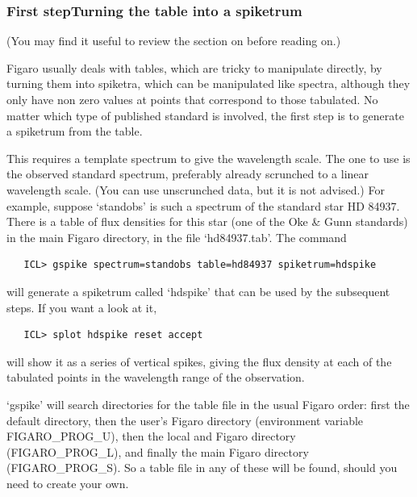 
\subsubsection{\label{techno5first}First step\latorhtm{---}{-}Turning the
   table into a spiketrum}

   (You may find it useful to review
   {the section on }
   before reading on.)

   Figaro usually deals with tables, which are tricky to manipulate
   directly, by turning them into spiketra, which can be manipulated
   like spectra, although they only have non zero values at points that
   correspond to those tabulated.  No matter which type of published
   standard is involved, the first step is to generate a spiketrum from
   the table.

   This requires a template spectrum to give the wavelength scale.  The
   one to use is the observed standard spectrum, preferably already
   scrunched to a linear wavelength scale.  (You can use unscrunched
   data, but it is not advised.)  For example, suppose `standobs' is
   such a spectrum of the standard star HD 84937.  There is a table of
   flux densities for this star (one of the Oke \& Gunn standards) in
   the main Figaro directory, in the file `hd84937.tab'.  The command

\begin{verbatim}
   ICL> gspike spectrum=standobs table=hd84937 spiketrum=hdspike
\end{verbatim}

   will generate a spiketrum called `hdspike' that can be used by the
   subsequent steps.  If you want a look at it,

\begin{verbatim}
   ICL> splot hdspike reset accept
\end{verbatim}

   will show it as a series of vertical spikes, giving the flux density
   at each of the tabulated points in the wavelength range of the
   observation.

   `gspike' will search directories for the table file in the usual
   Figaro order: first the default directory, then the user's Figaro
   directory (environment variable FIGARO\_PROG\_U), then the local and
   Figaro directory (FIGARO\_PROG\_L), and finally the main Figaro
   directory (FIGARO\_PROG\_S).  So a table file in any of these will be
   found, should you need to create your own.

